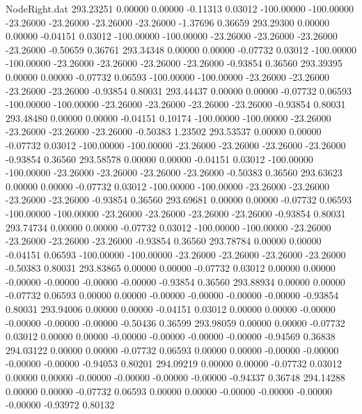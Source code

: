 \begin{filecontents}{NodeRight.dat}
 293.23251    0.00000    0.00000    -0.11313    0.03012 -100.00000 -100.00000  -23.26000  -23.26000  -23.26000  -23.26000   -1.37696    0.36659
 293.29300    0.00000    0.00000    -0.04151    0.03012 -100.00000 -100.00000  -23.26000  -23.26000  -23.26000  -23.26000   -0.50659    0.36761
 293.34348    0.00000    0.00000    -0.07732    0.03012 -100.00000 -100.00000  -23.26000  -23.26000  -23.26000  -23.26000   -0.93854    0.36560
 293.39395    0.00000    0.00000    -0.07732    0.06593 -100.00000 -100.00000  -23.26000  -23.26000  -23.26000  -23.26000   -0.93854    0.80031
 293.44437    0.00000    0.00000    -0.07732    0.06593 -100.00000 -100.00000  -23.26000  -23.26000  -23.26000  -23.26000   -0.93854    0.80031
 293.48480    0.00000    0.00000    -0.04151    0.10174 -100.00000 -100.00000  -23.26000  -23.26000  -23.26000  -23.26000   -0.50383    1.23502
 293.53537    0.00000    0.00000    -0.07732    0.03012 -100.00000 -100.00000  -23.26000  -23.26000  -23.26000  -23.26000   -0.93854    0.36560
 293.58578    0.00000    0.00000    -0.04151    0.03012 -100.00000 -100.00000  -23.26000  -23.26000  -23.26000  -23.26000   -0.50383    0.36560
 293.63623    0.00000    0.00000    -0.07732    0.03012 -100.00000 -100.00000  -23.26000  -23.26000  -23.26000  -23.26000   -0.93854    0.36560
 293.69681    0.00000    0.00000    -0.07732    0.06593 -100.00000 -100.00000  -23.26000  -23.26000  -23.26000  -23.26000   -0.93854    0.80031
 293.74734    0.00000    0.00000    -0.07732    0.03012 -100.00000 -100.00000  -23.26000  -23.26000  -23.26000  -23.26000   -0.93854    0.36560
 293.78784    0.00000    0.00000    -0.04151    0.06593 -100.00000 -100.00000  -23.26000  -23.26000  -23.26000  -23.26000   -0.50383    0.80031
 293.83865    0.00000    0.00000    -0.07732    0.03012    0.00000    0.00000   -0.00000   -0.00000   -0.00000   -0.00000   -0.93854    0.36560
 293.88934    0.00000    0.00000    -0.07732    0.06593    0.00000    0.00000   -0.00000   -0.00000   -0.00000   -0.00000   -0.93854    0.80031
 293.94006    0.00000    0.00000    -0.04151    0.03012    0.00000    0.00000   -0.00000   -0.00000   -0.00000   -0.00000   -0.50436    0.36599
 293.98059    0.00000    0.00000    -0.07732    0.03012    0.00000    0.00000   -0.00000   -0.00000   -0.00000   -0.00000   -0.94569    0.36838
 294.03122    0.00000    0.00000    -0.07732    0.06593    0.00000    0.00000   -0.00000   -0.00000   -0.00000   -0.00000   -0.94053    0.80201
 294.09219    0.00000    0.00000    -0.07732    0.03012    0.00000    0.00000   -0.00000   -0.00000   -0.00000   -0.00000   -0.94337    0.36748
 294.14288    0.00000    0.00000    -0.07732    0.06593    0.00000    0.00000   -0.00000   -0.00000   -0.00000   -0.00000   -0.93972    0.80132

\end{filecontents}
